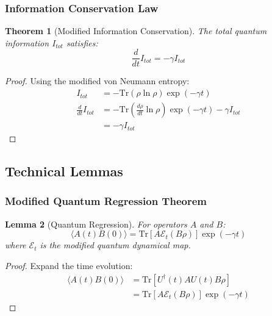 \documentclass[12pt]{article}
\theoremstyle{plain}
\newtheorem{theorem}{Theorem}[section]
\newtheorem{lemma}[theorem]{Lemma}
\theoremstyle{definition}
\theoremstyle{remark}
\begin{document}
\subsubsection{Information Conservation Law}

\begin{theorem}[Modified Information Conservation]
The total quantum information $I_{tot}$ satisfies:
\begin{equation}
\frac{d}{dt}I_{tot} = -\gamma I_{tot}
\end{equation}
\end{theorem}

\begin{proof}
Using the modified von Neumann entropy:
\begin{equation}
\begin{aligned}
I_{tot} &= -\text{Tr}(\rho\ln\rho)\exp(-\gamma t) \\
\frac{d}{dt}I_{tot} &= -\text{Tr}\left(\frac{d\rho}{dt}\ln\rho\right)\exp(-\gamma t) - \gamma I_{tot} \\
&= -\gamma I_{tot}
\end{aligned}
\end{equation}
\end{proof}

\subsection{Technical Lemmas}

\subsubsection{Modified Quantum Regression Theorem}

\begin{lemma}[Quantum Regression]
For operators $A$ and $B$:
\begin{equation}
\langle A(t)B(0)\rangle = \text{Tr}[A\mathcal{E}_t(B\rho)]\exp(-\gamma t)
\end{equation}
where $\mathcal{E}_t$ is the modified quantum dynamical map.
\end{lemma}

\begin{proof}
Expand the time evolution:
\begin{equation}
\begin{aligned}
\langle A(t)B(0)\rangle &= \text{Tr}[U^\dagger(t)AU(t)B\rho] \\
&= \text{Tr}[A\mathcal{E}_t(B\rho)]\exp(-\gamma t)
\end{aligned}
\end{equation}
\end{proof}
\end{document}
